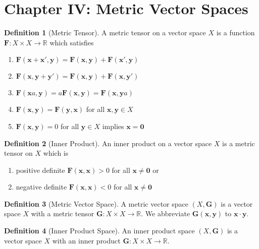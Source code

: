 \documentclass[letterpaper,12pt]{article}
\theoremstyle{plain}
\theoremstyle{plain}
\theoremstyle{definition}
\newtheorem{defn}{Definition}
\begin{document}
\section{Chapter IV: Metric Vector Spaces}
\begin{defn}[Metric Tensor]\label{defmettns}
A metric tensor on a vector space $X$ is a function $\mathbf{F}:X\times X\rightarrow \mathbb{R}$ which satisfies
\begin{enumerate}
\item $\mathbf{F}(\mathbf{x}+\mathbf{x}',\mathbf{y})=\mathbf{F}(\mathbf{x},\mathbf{y})+\mathbf{F}(\mathbf{x}',\mathbf{y})$
\item $\mathbf{F}(\mathbf{x},\mathbf{y}+\mathbf{y}')=\mathbf{F}(\mathbf{x},\mathbf{y})+\mathbf{F}(\mathbf{x},\mathbf{y}')$
\item $\mathbf{F}(\mathbf{x}a,\mathbf{y})=a\mathbf{F}(\mathbf{x},\mathbf{y})=\mathbf{F}(\mathbf{x},\mathbf{y}a)$
\item $\mathbf{F}(\mathbf{x},\mathbf{y})=\mathbf{F}(\mathbf{y},\mathbf{x})$ for all $\mathbf{x},\mathbf{y}\in X$
\item $\mathbf{F}(\mathbf{x},\mathbf{y})=0$ for all $\mathbf{y}\in X$ implies $\mathbf{x}=\mathbf{0}$
\end{enumerate}
\end{defn}

\begin{defn}[Inner Product]\label{definnpdt}
An inner product on a vector space $X$ is a metric tensor on $X$ which is
\begin{enumerate}
\item positive definite $\mathbf{F}(\mathbf{x},\mathbf{x})>0$ for all $\mathbf{x}\neq \mathbf{0}$ or
\item negative definite $\mathbf{F}(\mathbf{x},\mathbf{x})<0$ for all $\mathbf{x}\neq \mathbf{0}$
\end{enumerate}
\end{defn}

\begin{defn}[Metric Vector Space]\label{defmetvs}
A metric vector space $(X,\mathbf{G})$ is a vector space $X$ with a metric tensor $\mathbf{G}:X\times X \rightarrow \mathbb{R}$. We abbreviate $\mathbf{G}(\mathbf{x},\mathbf{y})$ to $\mathbf{x}\cdot\mathbf{y}$.
\end{defn}

\begin{defn}[Inner Product Space]\label{definpsp}
An inner product space $(X,\mathbf{G})$ is a vector space $X$ with an inner product $\mathbf{G}:X\times X \rightarrow \mathbb{R}$.
\end{defn}
\end{document}
